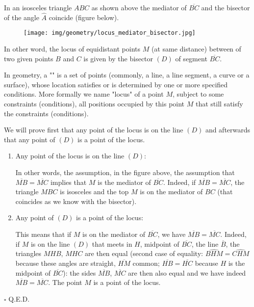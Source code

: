 	\pagebreak
	\begin{theorem}
	In an isosceles triangle $ABC$ as shown above the mediator of $\overline{BC}$ and the bisector of the angle $\hat{A}$ coincide (figure below).
	\begin{figure}[H]
		\centering
		\texttt{[image: img/geometry/locus\_mediator\_bisector.jpg]}
	\end{figure}
	In other word, the locus of equidistant points $M$ (at same distance) between of two given points $B$ and $C$ is given by the bisector $(D)$ of segment $\overline{BC}$.
	\begin{tcolorbox}[title=Remark,colframe=black,arc=10pt]
	In geometry, a "" is a set of points (commonly, a line, a line segment, a curve or a surface), whose location satisfies or is determined by one or more specified conditions. More formally we name "locus" of a point $M$, subject to some constraints (conditions), all positions occupied by this point $M$ that still satisfy the constraints (conditions).
	\end{tcolorbox}
	\end{theorem}
	\begin{dem}
	We will prove first that any point of the locus is on the line $(D)$ and afterwards that any point of $(D)$ is a point of the locus.
	\begin{enumerate}
		\item Any point of the locus is on the line $(D)$:

		In other words, the assumption, in the figure above, the assumption that $\overline{MB} =\overline{MC}$ implies that $M$ is the mediator of $\overline{BC}$. Indeed, if $\overline{MB} =\overline{MC}$, the triangle $MBC$ is isosceles and the top $M$ is on the mediator of $BC$ (that coincides as we know with the bisector).
			
		\item Any point of $(D)$ is a point of the locus:
		
		This means that if $M$ is on the mediator of $\overline{BC}$, we have $\overline{MB} = \overline{MC}$. Indeed, if $M$ is on the line $(D)$ that meets in $H$, midpoint of $\overline{BC}$, the line $\overline{B}$, the triangles $MHB$, $MHC$ are then equal (second case of equality: $\widehat{BHM}=\widehat{CHM}$ because these angles are straight, $\overline{HM}$ common; $\overline{HB} = \overline{HC}$ because $H$ is the midpoint of $\overline{BC}$): the sides $\overline{MB}$, $\overline{MC}$ are then also equal and we have indeed $\overline{MB} = \overline{MC}$. The point $M$ is a point of the locus.

	\end{enumerate}
	\begin{flushright}
		$\square$  Q.E.D.
	\end{flushright}
	\end{dem}
